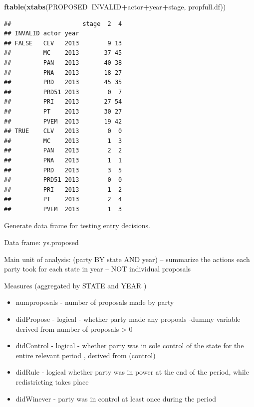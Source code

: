 \documentclass[]{article}
\newenvironment{Shaded}{\begin{snugshade}}{\end{snugshade}}
\newcommand{\KeywordTok}[1]{\textcolor[rgb]{0.13,0.29,0.53}{\textbf{#1}}}
\newcommand{\NormalTok}[1]{#1}
\newcommand{\OperatorTok}[1]{\textcolor[rgb]{0.81,0.36,0.00}{\textbf{#1}}}
\providecommand{\tightlist}{%
  \setlength{\itemsep}{0pt}\setlength{\parskip}{0pt}}
\begin{document}
\begin{Shaded}
\begin{Highlighting}[]
\KeywordTok{ftable}\NormalTok{(}\KeywordTok{xtabs}\NormalTok{(PROPOSED}\OperatorTok{~}\NormalTok{INVALID}\OperatorTok{+}\NormalTok{actor}\OperatorTok{+}\NormalTok{year}\OperatorTok{+}\NormalTok{stage, propfull.df))}
\end{Highlighting}
\end{Shaded}

\begin{verbatim}
##                    stage  2  4
## INVALID actor year            
## FALSE   CLV   2013        9 13
##         MC    2013       37 45
##         PAN   2013       40 38
##         PNA   2013       18 27
##         PRD   2013       45 35
##         PRD51 2013        0  7
##         PRI   2013       27 54
##         PT    2013       30 27
##         PVEM  2013       19 42
## TRUE    CLV   2013        0  0
##         MC    2013        1  3
##         PAN   2013        2  2
##         PNA   2013        1  1
##         PRD   2013        3  5
##         PRD51 2013        0  0
##         PRI   2013        1  2
##         PT    2013        2  4
##         PVEM  2013        1  3
\end{verbatim}

Generate data frame for testing entry decisions.

Data frame: ys.proposed

Main unit of analysis: (party BY state AND year) -- summarize the
actions each party took for each state in year -- NOT individual
proposals

Measures (aggregated by STATE and YEAR )

\begin{itemize}
\tightlist
\item
  numproposals - number of proposals made by party
\item
  didPropose - logical - whether party made any propoals -dummy variable
  derived from number of proposals \textgreater{} 0
\item
  didControl - logical - whether party was in sole control of the state
  for the entire relevant period , derived from (control)
\item
  didRule - logical whether party was in power at the end of the period,
  while redistricting takes place
\item
  didWinever - party was in control at least once during the period
\end{itemize}
\end{document}
